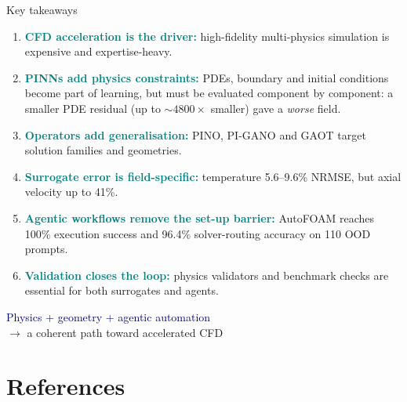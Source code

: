 \documentclass[aspectratio=169,10pt]{beamer}
\newcommand{\key}[1]{\textcolor{teal}{\textbf{#1}}}
\begin{document}
\begin{frame}{Key takeaways}
\begin{enumerate}\setlength{\itemsep}{3pt}\small
  \item \key{CFD acceleration is the driver:} high-fidelity multi-physics simulation is expensive and expertise-heavy.
  \item \key{PINNs add physics constraints:} PDEs, boundary and initial conditions become part of learning, but must be evaluated component by component: a smaller PDE residual (up to $\sim\!4800\times$ smaller) gave a \emph{worse} field.
  \item \key{Operators add generalisation:} PINO, PI-GANO and GAOT target solution families and geometries.
  \item \key{Surrogate error is field-specific:} temperature 5.6--9.6\% NRMSE, but axial velocity up to 41\%.
  \item \key{Agentic workflows remove the set-up barrier:} AutoFOAM reaches 100\% execution success and 96.4\% solver-routing accuracy on 110 OOD prompts.
  \item \key{Validation closes the loop:} physics validators and benchmark checks are essential for both surrogates and agents.
\end{enumerate}
\vfill
\centering
\large\textcolor{navy}{Physics + geometry + agentic automation}\\
\large\textcolor{midgray}{$\longrightarrow$ a coherent path toward accelerated CFD}
\end{frame}

\section{References}
\end{document}

